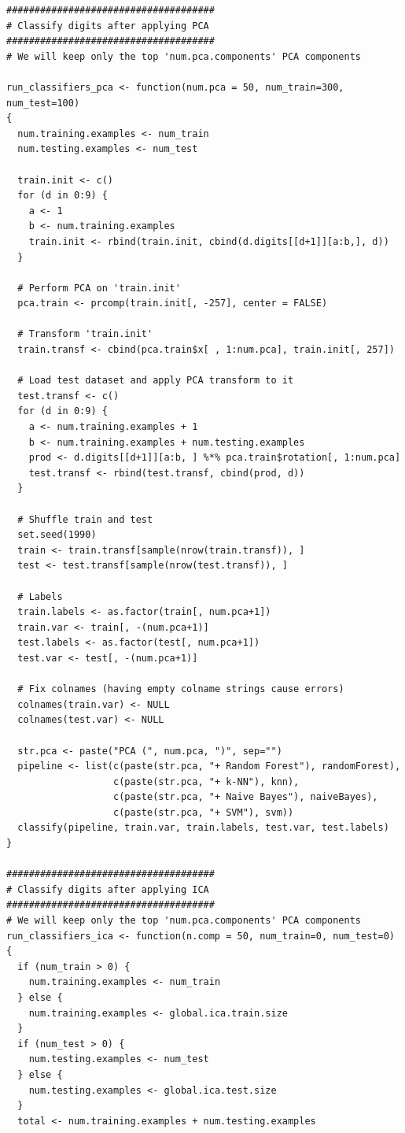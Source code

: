 \documentclass[12pt,article,oneside]{memoir}
\begin{document}
\begin{verbatim}
#####################################
# Classify digits after applying PCA
#####################################
# We will keep only the top 'num.pca.components' PCA components

run_classifiers_pca <- function(num.pca = 50, num_train=300, num_test=100)
{
  num.training.examples <- num_train
  num.testing.examples <- num_test
  
  train.init <- c()
  for (d in 0:9) {
    a <- 1
    b <- num.training.examples
    train.init <- rbind(train.init, cbind(d.digits[[d+1]][a:b,], d))
  }
  
  # Perform PCA on 'train.init'
  pca.train <- prcomp(train.init[, -257], center = FALSE)
  
  # Transform 'train.init'
  train.transf <- cbind(pca.train$x[ , 1:num.pca], train.init[, 257])
  
  # Load test dataset and apply PCA transform to it
  test.transf <- c()
  for (d in 0:9) {
    a <- num.training.examples + 1
    b <- num.training.examples + num.testing.examples
    prod <- d.digits[[d+1]][a:b, ] %*% pca.train$rotation[, 1:num.pca]
    test.transf <- rbind(test.transf, cbind(prod, d))
  }
  
  # Shuffle train and test
  set.seed(1990)
  train <- train.transf[sample(nrow(train.transf)), ]
  test <- test.transf[sample(nrow(test.transf)), ]
  
  # Labels
  train.labels <- as.factor(train[, num.pca+1])
  train.var <- train[, -(num.pca+1)]
  test.labels <- as.factor(test[, num.pca+1])
  test.var <- test[, -(num.pca+1)]
  
  # Fix colnames (having empty colname strings cause errors)
  colnames(train.var) <- NULL
  colnames(test.var) <- NULL
  
  str.pca <- paste("PCA (", num.pca, ")", sep="")
  pipeline <- list(c(paste(str.pca, "+ Random Forest"), randomForest),
                   c(paste(str.pca, "+ k-NN"), knn),
                   c(paste(str.pca, "+ Naive Bayes"), naiveBayes),
                   c(paste(str.pca, "+ SVM"), svm))
  classify(pipeline, train.var, train.labels, test.var, test.labels)
}

#####################################
# Classify digits after applying ICA
#####################################
# We will keep only the top 'num.pca.components' PCA components
run_classifiers_ica <- function(n.comp = 50, num_train=0, num_test=0)
{
  if (num_train > 0) {
    num.training.examples <- num_train
  } else {
    num.training.examples <- global.ica.train.size
  }
  if (num_test > 0) {
    num.testing.examples <- num_test
  } else {
    num.testing.examples <- global.ica.test.size
  }
  total <- num.training.examples + num.testing.examples
  

\end{verbatim}
\end{document}
